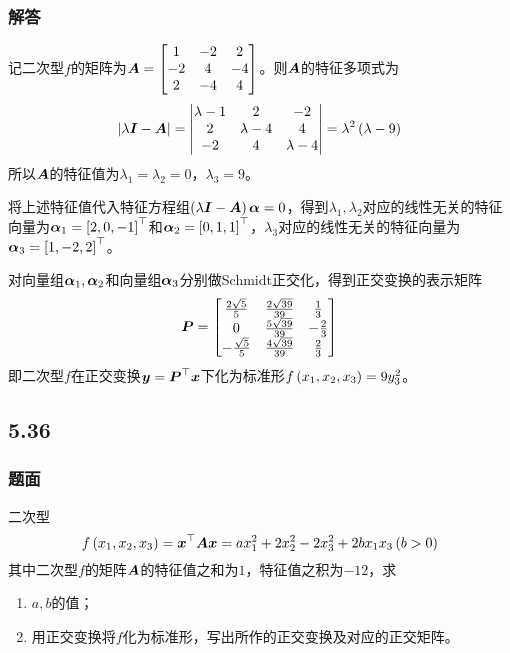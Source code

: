 \documentclass[9pt,xcolor=svgnames]{beamer} %
\begin{document}
\begin{frame}[allowframebreaks]
    \frametitle{解答}
    记二次型\(f\)的矩阵为\(\boldsymbol{A}=\begin{bmatrix}1&-2&2\\-2&4&-4\\2&-4&4\end{bmatrix}\)。则\(\boldsymbol{A}\)的特征多项式为
    \begin{equation*}
        \left|\lambda\boldsymbol{I}-\boldsymbol{A} \right|=\begin{vmatrix}\lambda-1&2&-2\\2&\lambda-4&4\\-2&4&\lambda-4\end{vmatrix}=\lambda^2\left( \lambda-9 \right)
    \end{equation*}
    所以\(\boldsymbol{A}\)的特征值为\(\lambda_1=\lambda_2=0\)，\(\lambda_3=9\)。

    将上述特征值代入特征方程组\(\left( \lambda\boldsymbol{I}-\boldsymbol{A} \right)\boldsymbol{\alpha}=0\)，得到\(\lambda_1,\lambda_2\)对应的线性无关的特征向量为\(\boldsymbol{\alpha}_1=\left[ 2,0,-1 \right]^\top\)和\(\boldsymbol{\alpha}_2=\left[ 0,1,1 \right]^\top\)，\(\lambda_3\)对应的线性无关的特征向量为\(\boldsymbol{\alpha}_3=\left[ 1,-2,2 \right]^\top\)。

    对向量组\(\boldsymbol{\alpha}_1,\boldsymbol{\alpha}_2\)和向量组\(\boldsymbol{\alpha}_3\)分别做Schmidt正交化，得到正交变换的表示矩阵
    \begin{equation*}
        \boldsymbol{P}=
        \begin{bmatrix}
            \frac{2\sqrt{5}}{5} & \frac{2\sqrt{39}}{39} & \frac{1}{3}  \\
            0                   & \frac{5\sqrt{39}}{39} & -\frac{2}{3} \\
            -\frac{\sqrt{5}}{5} & \frac{4\sqrt{39}}{39} & \frac{2}{3}
        \end{bmatrix}
    \end{equation*}
    即二次型\(f\)在正交变换\(\boldsymbol{y}=\boldsymbol{P}^\top\boldsymbol{x}\)下化为标准形\(f\left( x_1,x_2,x_3 \right)=9y_3^2\)。
\end{frame}

\subsection*{5.36}
\begin{frame}
    \frametitle{题面}
    二次型
    \begin{equation*}
        f\left( x_1,x_2,x_3 \right)=\boldsymbol{x}^\top\boldsymbol{A}\boldsymbol{x}=ax_1^2+2x_2^2-2x_3^2+2bx_1x_3\left( b>0 \right)
    \end{equation*}
    其中二次型\(f\)的矩阵\(\boldsymbol{A}\)的特征值之和为\(1\)，特征值之积为\(-12\)，求
    \begin{enumerate}
        \item \(a,b\)的值；
        \item 用正交变换将\(f\)化为标准形，写出所作的正交变换及对应的正交矩阵。
    \end{enumerate}
\end{frame}
\end{document}
